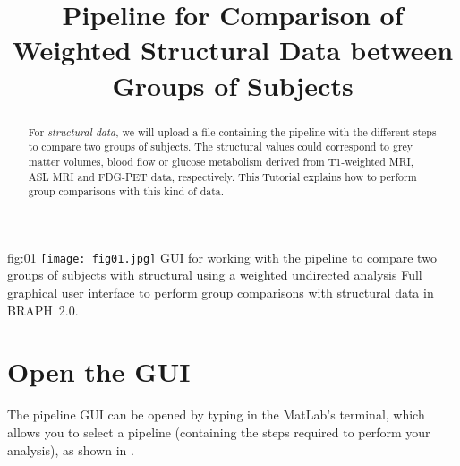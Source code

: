 \documentclass[justified]{tufte-handout}
\title{Pipeline for Comparison of Weighted Structural Data between Groups of Subjects}
\begin{document}
\maketitle

\begin{abstract}
\noindent
For \emph{structural data}, we will upload a file containing the pipeline with the different steps to compare two groups of subjects. The structural values could correspond to grey matter volumes, blood flow or glucose metabolism derived from T1-weighted MRI, ASL MRI and FDG-PET data, respectively. This Tutorial explains how to perform group comparisons with this kind of data.
\end{abstract}

\tableofcontents

	{fig:01}
	{\texttt{[image: fig01.jpg]}}
	{GUI for working with the pipeline to compare two groups of subjects with structural using a weighted undirected analysis}
	{
	Full graphical user interface to perform group comparisons with structural data in BRAPH~2.0. 
	}

\clearpage
\section{Open the GUI}

The pipeline GUI can be opened by typing  in the MatLab's terminal, which allows you to select a pipeline (containing the steps required to perform your analysis), as shown in .
\end{document}
